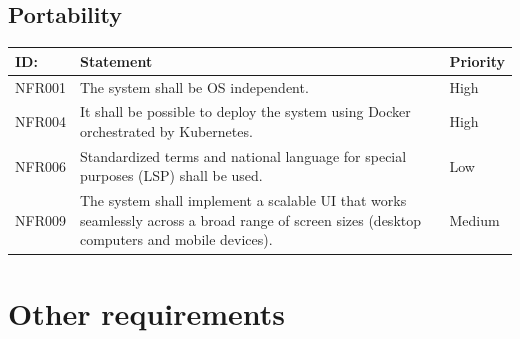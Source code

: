\documentclass{scrreprt}
\begin{document}
\subsection{Portability}

\begin{center}
\begin{tabularx}{\linewidth}{| l | X | l |}
\hline
\textbf{ID:} & \textbf{Statement} & \textbf{Priority} \\
\hline
NFR001 & 
The system shall be OS independent. &
High \\ 
\hline
NFR004 & 
It shall be possible to deploy the system using Docker orchestrated by Kubernetes. &
High \\ 
\hline
NFR006 & 
Standardized terms and national language for special purposes (LSP) shall be used. &
Low \\ 
\hline
NFR009 & 
The system shall implement a scalable UI that works seamlessly across a broad range of screen sizes (desktop computers and mobile devices). &
Medium \\ 
\hline
\end{tabularx}
\end{center}


\section{Other requirements}
\end{document}
